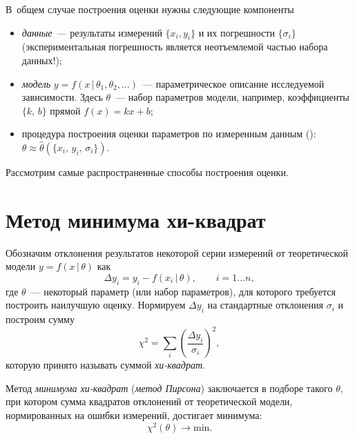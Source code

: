 В~общем случае построения оценки нужны следующие компоненты
\begin{itemize}
    \item \emph{данные}~--- результаты измерений $\{x_i, y_i\}$
    и их погрешности $\{\sigma_i\}$
    (экспериментальная погрешность является неотъемлемой
    частью набора данных!);
    \item \emph{модель} $y=f(x\,|\,{\theta_1,\theta_2,\ldots })$~---
параметрическое описание исследуемой зависимости.
Здесь $\theta$~--- набор параметров модели, например,
коэффициенты $\{k,\,b\}$ прямой $f(x)=kx+b$;

\item процедура построения оценки параметров по измеренным данным (): 
$\theta \approx \hat{\theta}(\{x_i,\,y_i,\,\sigma_i\})$.

\end{itemize}

Рассмотрим самые распространенные способы построения оценки.

\section{Метод минимума хи-квадрат}
\label{sec:chi2}

Обозначим отклонения результатов некоторой серии измерений от теоретической
модели $y=f(x\,|\, \theta)$ как
\[
 \Delta y_i = y_i- f(x_i\,|\,\theta),\qquad i= 1\ldots n,
\]
где $\theta$~--- некоторый параметр (или набор параметров),
для которого требуется построить наилучшую оценку. Нормируем $\Delta y_i$
на стандартные отклонения $\sigma_i$ и построим сумму
\begin{equation}
    \chi^2 = \sum_i{\left(\frac{\Delta y_i}{\sigma_i}\right)^2},
    \label{eq:chi2}
\end{equation}
которую принято называть суммой \emph{хи-квадрат}.

Метод \emph{минимума хи-квадрат} (\emph{метод Пирсона}) заключается в подборе такого
$\theta$, при котором сумма квадратов отклонений от теоретической
модели, нормированных на ошибки измерений, достигает минимума:
\[
\chi^2(\theta) \to \mathrm{min}.
\]


